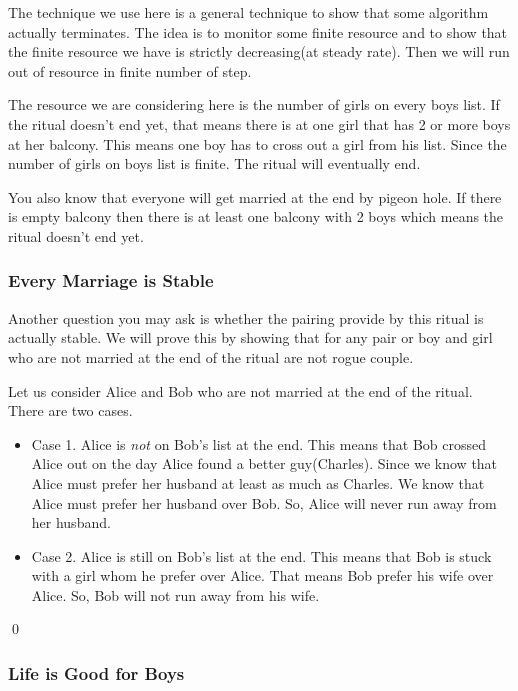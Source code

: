 \documentclass[a4paper, 12pt]{article}
\newcommand{\qedd}{\qed\newline}
\begin{document}
		The technique we use here is a general technique to show that some algorithm actually terminates. The idea is to monitor some finite resource and to show that the finite resource we have is strictly decreasing(at steady rate). Then we will run out of resource in finite number of step.
		
		The resource we are considering here is the number of girls on every boys list. If the ritual doesn't end yet, that means there is at one girl that has 2 or more boys at her balcony. This means one boy has to cross out a girl from his list. Since the number of girls on boys list is finite. The ritual will eventually end.
		
		You also know that everyone will get married at the end by pigeon hole. If there is empty balcony then there is at least one balcony with 2 boys which means the ritual doesn't end yet.
	
	\subsubsection*{Every Marriage is Stable}
	
		Another question you may ask is whether the pairing provide by this ritual is actually stable. We will prove this by showing that for any pair or boy and girl who are not married at the end of the ritual are not rogue couple.
		
		Let us consider Alice and Bob who are not married at the end of the ritual. There are two cases.
		
		\begin{itemize}
			\item Case 1. Alice is \emph{not} on Bob's list at the end. This means that Bob crossed Alice out on the day Alice found a better guy(Charles). Since we know that Alice must prefer her husband at least as much as Charles. We know that Alice must prefer her husband over Bob. So, Alice will never run away from her husband.
			
			\item Case 2. Alice is still on Bob's list at the end. This means that Bob is stuck with a girl whom he prefer over Alice. That means Bob prefer his wife over Alice. So, Bob will not run away from his wife. 
		\end{itemize}
		\qedd
		
	\subsubsection*{Life is Good for Boys}
	
\end{document}
